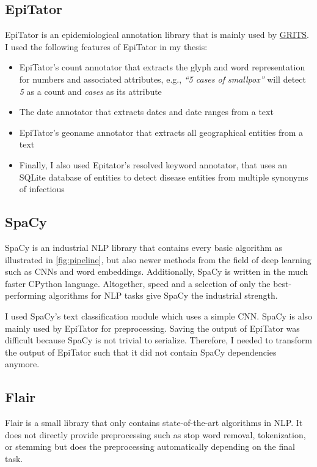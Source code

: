 \subsection{EpiTator}
  EpiTator is an epidemiological annotation library that is mainly used by \href{https://grits.eha.io}{GRITS}.
  I used the following features of EpiTator in my thesis:
  \begin{itemize}
    \item EpiTator's count annotator that extracts the glyph and word representation for numbers and associated attributes, e.g., \textit{``5 cases of smallpox''} will detect \textit{5} as a count and \textit{cases} as its attribute
    \item The date annotator that extracts dates and date ranges from a text
    \item EpiTator's geoname annotator that extracts all geographical entities from a text
    \item Finally, I also used Epitator's resolved keyword annotator, that uses an SQLite database of entities to detect disease entities from multiple synonyms of infectious
  \end{itemize}

\subsection{SpaCy}
  SpaCy is an industrial NLP library that contains every basic algorithm as illustrated in \ref{fig:pipeline}, but also newer methods from the field of deep learning such as CNNs and word embeddings.
  Additionally, SpaCy is written in the much faster CPython language.
  Altogether, speed and a selection of only the best-performing algorithms for NLP tasks give SpaCy the industrial strength.

  I used SpaCy's text classification module which uses a simple CNN.
  SpaCy is also mainly used by EpiTator for preprocessing.
  Saving the output of EpiTator was difficult because SpaCy is not trivial to serialize.
  Therefore, I needed to transform the output of EpiTator such that it did not contain SpaCy dependencies anymore.

\subsection{Flair}
  Flair is a small library that only contains state-of-the-art algorithms in NLP.
  It does not directly provide preprocessing such as stop word removal, tokenization, or stemming but does the preprocessing automatically depending on the final task.

